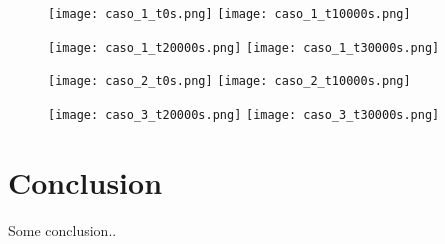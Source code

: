 \documentclass{article}
\begin{document}
\begin{figure}[H]
\texttt{[image: caso\_1\_t0s.png]}
\texttt{[image: caso\_1\_t10000s.png]}
\label{fig:Difusion termica}
\end{figure}

\begin{figure}[H]
\texttt{[image: caso\_1\_t20000s.png]}
\texttt{[image: caso\_1\_t30000s.png]}
\label{fig:Difusion termica}
\end{figure}

\begin{figure}[H]
\texttt{[image: caso\_2\_t0s.png]}
\texttt{[image: caso\_2\_t10000s.png]}
\label{fig:Difusion termica}
\end{figure}

\begin{figure}[H]
\texttt{[image: caso\_3\_t20000s.png]}
\texttt{[image: caso\_3\_t30000s.png]}
\label{fig:Difusion termica}
\end{figure}

\caption{Evolucion Difusion termica}

\section{Conclusion}
Some conclusion..
\end{document}
